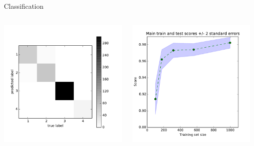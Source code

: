 \documentclass[final,hyperref={pdfpagelabels=false}]{beamer}
\begin{document}
\begin{frame}[t]
\begin{columns}[t]
\begin{column}{.465\textwidth}
\begin{block}{Classification}
\begin{columns} %
\begin{column}{.4\textwidth} %
\includegraphics[width=1\linewidth]{confusion}
\end{column}
\begin{column}{.4\textwidth}
\includegraphics[width=1\linewidth]{learning}
\end{column}
\end{columns} %
\end{block}



\end{column}
\end{columns}
\end{frame}
\end{document}
